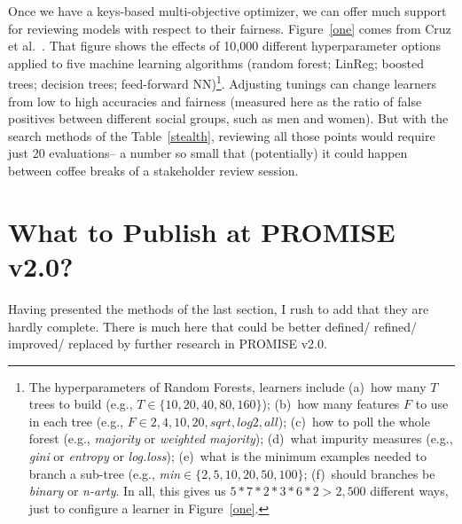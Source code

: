 \documentclass[sigconf,screen]{acmart}
\begin{document}
Once we have a keys-based multi-objective optimizer, we can offer much support for reviewing models with respect to their fairness.
Figure~\ref{one} comes from Cruz et al.~\cite{cruz2021promoting}.
  That figure 
 shows the effects of 10,000 different   hyperparameter   options applied to five
machine learning algorithms
(random forest; LinReg;
boosted trees; decision trees; feed-forward NN)\footnote{The hyperparameters of     Random Forests,       learners
include
(a)~how many $T$   trees to build (e.g., $T\in \{10,20,40,80,160\}$); (b)~how many features $F$
to use in each tree (e.g., $F \in{2,4,10,20,
\mathit{sqrt}, \mathit{log2}, \mathit{all}}$);
(c)~how to  poll the whole forest (e.g., {\em majority} or {\em weighted majority}); 
(d)~what impurity measures (e.g., {\em gini} or {\em entropy} or {\em log.loss}); (e)~what is the minimum examples needed to branch a sub-tree
(e.g., {\em min}$\in \{2,5,10,20,50,100\}$; (f)~should branches be {\em binary} or {\em n-arty}.
In all, this gives us
$5*7*2*3*6*2 > 2,500$ different ways, just to configure a learner in Figure~\ref{one}. }. 
Adjusting tunings  can change 
learners from   low to   high accuracies and fairness (measured here as the ratio of false
positives between different social groups, such as men and women).   
But with the search methods of the Table~\ref{stealth},
reviewing all those points would require just 20 evaluations-- a number so small that (potentially) it could happen between coffee breaks of a stakeholder review session. 








\section{What to Publish at PROMISE v2.0?}

Having presented the methods of the last section,
I rush to add that they are hardly complete.  There is much here that could be better defined/ refined/ improved/ replaced by further research in PROMISE v2.0.
\end{document}
